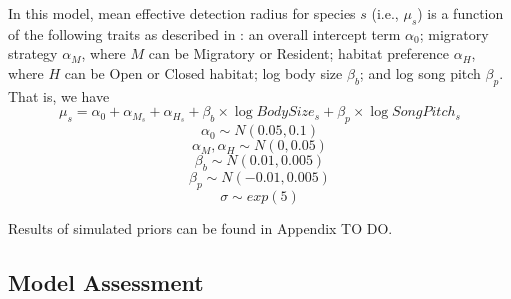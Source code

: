 \documentclass[12pt]{article}
\begin{document}
\par In this model, mean effective detection radius for species $s$ (i.e., $\mu_s$) is a function of the following traits as described in \cite{solymos_phylogeny_2018}: an overall intercept term $\alpha_0$; migratory strategy $\alpha_M$, where $M$ can be Migratory or Resident; habitat preference $\alpha_H$, where $H$ can be Open or Closed habitat; log body size $\beta_b$; and log song pitch $\beta_p$. 
That is, we have
$$ \mu_s = \alpha_0 + \alpha_{M_s} + \alpha_{H_s} + \beta_b \times \log BodySize_s + \beta_p \times \log SongPitch_s$$
$$\alpha_0 \sim N(0.05, 0.1)$$
$$ \alpha_M, \alpha_H \sim N(0, 0.05)$$
$$ \beta_b \sim N(0.01, 0.005)$$
$$ \beta_p \sim N(-0.01, 0.005) $$
$$\sigma \sim exp(5)$$

\par Results of simulated priors can be found in Appendix TO DO.

\subsection{Model Assessment}


\end{document}
